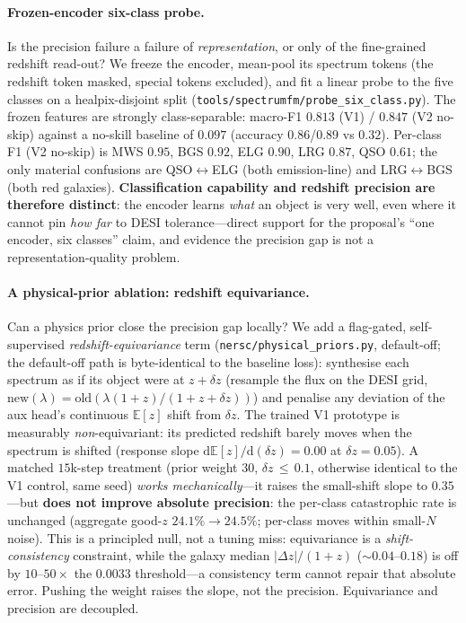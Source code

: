 \documentclass[11pt,letterpaper]{article}
\begin{document}
\paragraph{Frozen-encoder six-class probe.}
Is the precision failure a failure of \emph{representation}, or only of the
fine-grained redshift read-out? We freeze the encoder, mean-pool its spectrum
tokens (the redshift token masked, special tokens excluded), and fit a linear
probe to the five classes on a healpix-disjoint split
(\texttt{tools/spectrumfm/probe\_six\_class.py}). The frozen features are
strongly class-separable: macro-F1 $0.813$ (V1) / $0.847$ (V2 no-skip) against a
no-skill baseline of $0.097$ (accuracy $0.86$/$0.89$ vs $0.32$). Per-class F1
(V2 no-skip) is MWS $0.95$, BGS $0.92$, ELG $0.90$, LRG $0.87$, QSO $0.61$;
the only material confusions are QSO$\leftrightarrow$ELG (both emission-line) and
LRG$\leftrightarrow$BGS (both red galaxies). \textbf{Classification capability
and redshift precision are therefore distinct}: the encoder learns \emph{what}
an object is very well, even where it cannot pin \emph{how far} to DESI
tolerance---direct support for the proposal's ``one encoder, six classes''
claim, and evidence the precision gap is not a representation-quality problem.

\paragraph{A physical-prior ablation: redshift equivariance.}
Can a physics prior close the precision gap locally? We add a flag-gated,
self-supervised \emph{redshift-equivariance} term
(\texttt{nersc/physical\_priors.py}, default-off; the default-off path is
byte-identical to the baseline loss): synthesise each spectrum as if its object
were at $z{+}\delta z$ (resample the flux on the DESI grid,
$\textrm{new}(\lambda){=}\textrm{old}(\lambda(1{+}z)/(1{+}z{+}\delta z))$) and
penalise any deviation of the aux head's continuous $\mathbb{E}[z]$ shift from
$\delta z$. The trained V1 prototype is measurably \emph{non}-equivariant: its
predicted redshift barely moves when the spectrum is shifted (response slope
$\mathrm{d}\mathbb{E}[z]/\mathrm{d}(\delta z) {=} 0.00$ at $\delta z {=} 0.05$).
A matched $15$k-step treatment (prior weight $30$, $\delta z\,{\le}\,0.1$,
otherwise identical to the V1 control, same seed) \emph{works mechanically}---it
raises the small-shift slope to $0.35$---but \textbf{does not improve absolute
precision}: the per-class catastrophic rate is unchanged (aggregate good-$z$
$24.1\% {\to} 24.5\%$; per-class moves within small-$N$ noise). This is a
principled null, not a tuning miss: equivariance is a \emph{shift-consistency}
constraint, while the galaxy median $|\Delta z|/(1{+}z)$ (${\sim}0.04$--$0.18$)
is off by $10$--$50\times$ the $0.0033$ threshold---a consistency term cannot
repair that absolute error. Pushing the weight raises the slope, not the
precision. Equivariance and precision are decoupled.
\end{document}
